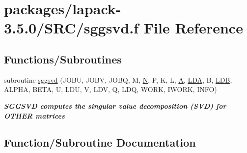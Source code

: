 \hypertarget{sggsvd_8f}{}\section{packages/lapack-\/3.5.0/\+S\+R\+C/sggsvd.f File Reference}
\label{sggsvd_8f}
\subsection*{Functions/\+Subroutines}
\begin{DoxyCompactItemize}
\item 
subroutine \hyperlink{sggsvd_8f_a1f5fc3fcbce9d081fd9b409626b47db5}{sggsvd} (J\+O\+B\+U, J\+O\+B\+V, J\+O\+B\+Q, M, \hyperlink{polmisc_8c_a0240ac851181b84ac374872dc5434ee4}{N}, P, K, L, \hyperlink{classA}{A}, \hyperlink{example__user_8c_ae946da542ce0db94dced19b2ecefd1aa}{L\+D\+A}, B, \hyperlink{example__user_8c_a50e90a7104df172b5a89a06c47fcca04}{L\+D\+B}, A\+L\+P\+H\+A, B\+E\+T\+A, U, L\+D\+U, V, L\+D\+V, Q, L\+D\+Q, W\+O\+R\+K, I\+W\+O\+R\+K, I\+N\+F\+O)
\begin{DoxyCompactList}\small\item\em {\bfseries  S\+G\+G\+S\+V\+D computes the singular value decomposition (S\+V\+D) for O\+T\+H\+E\+R matrices} \end{DoxyCompactList}\end{DoxyCompactItemize}


\subsection{Function/\+Subroutine Documentation}
\hypertarget{sggsvd_8f_a1f5fc3fcbce9d081fd9b409626b47db5}{}
